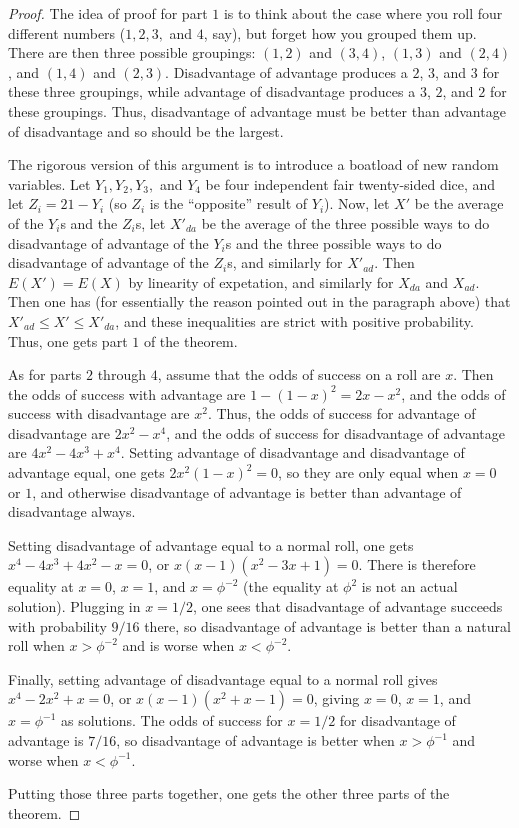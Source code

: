 \documentclass[11pt]{article}
\theoremstyle{definition}
\begin{document}
\begin{proof}
The idea of proof for part $1$ is to think about the case where you roll four different numbers ($1, 2, 3,$ and $4$, say), but forget how you grouped them up.  There are then three possible groupings: $(1, 2)$ and $(3, 4)$, $(1,3)$ and $(2,4)$, and $(1,4)$ and $(2,3)$.  Disadvantage of advantage produces a $2$, $3$, and $3$ for these three groupings, while advantage of disadvantage produces a $3$, $2$, and $2$ for these groupings.  Thus, disadvantage of advantage must be better than advantage of disadvantage and so should be the largest.

The rigorous version of this argument is to introduce a boatload of new random variables.  Let $Y_1, Y_2, Y_3,$ and $Y_4$ be four independent fair twenty-sided dice, and let $Z_i = 21-Y_i$ (so $Z_i$ is the ``opposite'' result of $Y_i$).  Now, let $X'$ be the average of the $Y_i$s and the $Z_i$s, let $X'_{da}$ be the average of the three possible ways to do disadvantage of advantage of the $Y_i$s and the three possible ways to do disadvantage of advantage of the $Z_i$s, and similarly for $X'_{ad}$.  Then $E(X') = E(X)$ by linearity of expetation, and similarly for $X_{da}$ and $X_{ad}$.  Then one has (for essentially the reason pointed out in the paragraph above) that $X'_{ad} \leq X' \leq X'_{da}$, and these inequalities are strict with positive probability.  Thus, one gets part $1$ of the theorem.

As for parts $2$ through $4$, assume that the odds of success on a roll are $x$.  Then the odds of success with advantage are $1-(1-x)^2 = 2x-x^2$, and the odds of success with disadvantage are $x^2$.  Thus, the odds of success for advantage of disadvantage are $2x^2-x^4$, and the odds of success for disadvantage of advantage are $4x^2-4x^3+x^4$.  Setting advantage of disadvantage and disadvantage of advantage equal, one gets $2x^2(1-x)^2 = 0$, so they are only equal when $x = 0$ or $1$, and otherwise disadvantage of advantage is better than advantage of disadvantage always.

Setting disadvantage of advantage equal to a normal roll, one gets $x^4-4x^3+4x^2-x = 0$, or $x(x-1)(x^2-3x+1) = 0$.  There is therefore equality at $x = 0$, $x = 1$, and $x = \phi^{-2}$ (the equality at $\phi^2$ is not an actual solution).  Plugging in $x = 1/2$, one sees that disadvantage of advantage succeeds with probability $9/16$ there, so disadvantage of advantage is better than a natural roll when $x > \phi^{-2}$ and is worse when $x < \phi^{-2}$.

Finally, setting advantage of disadvantage equal to a normal roll gives $x^4-2x^2+x = 0$, or $x(x-1)(x^2+x-1) = 0$, giving $x = 0$, $x = 1$, and $x = \phi^{-1}$ as solutions.  The odds of success for $x = 1/2$ for disadvantage of advantage is $7/16$, so disadvantage of advantage is better when $x > \phi^{-1}$ and worse when $x < \phi^{-1}$.

Putting those three parts together, one gets the other three parts of the theorem.
\end{proof}
\end{document}
